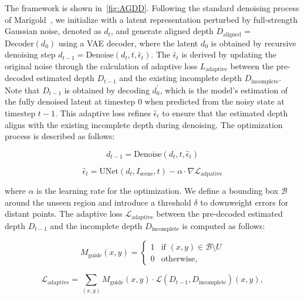 The framework is shown in~\cref{fig:AGDD}. Following the standard denoising process of Marigold~\cite{ke2023repurposing}, we initialize with a latent representation perturbed by full-strength Gaussian noise, denoted as $d_t$, and generate aligned depth $D_{\text{aligned}}$ = $\text{Decoder}(d_0)$ using a VAE decoder, where the latent $d_{0}$ is obtained by recursive denoising step $d_{t-1} = \text{Denoise}(d_t, t, \hat{\epsilon}_t)$. The $\hat{\epsilon}_t$ is derived by updating the original noise through the calculation of adaptive loss $L_{\text{adaptive}}$ between the pre-decoded estimated depth $D_{t-1}$ and the existing incomplete depth $D_{\text{incomplete}}$. Note that $D_{t-1}$ is obtained by decoding $d_{0}^{'}$, which is the model's estimation of the fully denoised latent at timestep $0$ when predicted from the noisy state at timestep $t-1$. This adaptive loss refines $\hat{\epsilon}_t$ to ensure that the estimated depth aligns with the existing incomplete depth during denoising. The optimization process is described as follows:
\begin{small}
\begin{equation} 
d_{t-1} = \text{Denoise}(d_t, t, \hat{\epsilon}_t) 
\end{equation} 
\end{small}
\begin{small}
\begin{equation} 
\hat{\epsilon}_t = \text{UNet}(d_t, I_{\text{scene}}, t) - \alpha \cdot \nabla \mathcal{L}_{\text{adpative}}
\end{equation} 
\end{small}
where \( \alpha \) is the learning rate for the optimization. We define a bounding box $\mathcal{B}$ around the unseen region and introduce a threshold $\delta$ to downweight errors for distant points. The adaptive loss $\mathcal{L}_{\text{adaptive}}$ between the pre-decoded estimated depth $D_{t-1}$ and the incomplete depth $D_{\text{incomplete}}$ is computed as follows:
\begin{small}
\begin{equation}
M_{\text{guide}}(x, y) = 
\begin{cases} 
1 & \text{if } (x, y) \in \mathcal{B} \setminus U \\
0 & \text{otherwise},
\end{cases}
\end{equation}
\end{small}
\begin{small}
\begin{equation}
\mathcal{L}_{\text{adaptive}} = \sum_{(x,y)} M_{\text{guide}}(x,y) \cdot \mathcal{L}(D_{t-1}, D_{\text{incomplete}})(x, y),
\end{equation}
\end{small}
